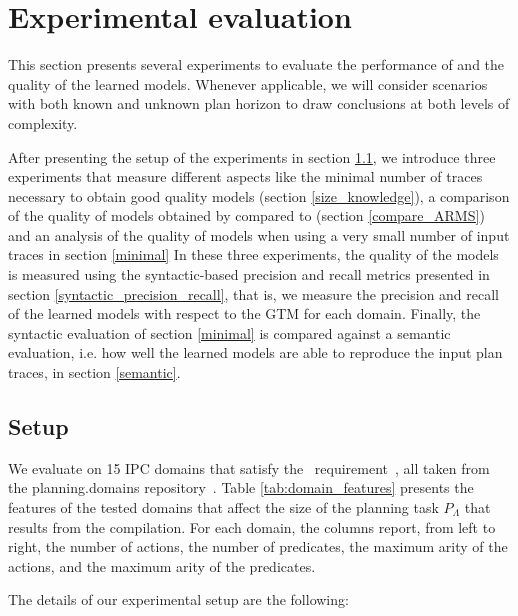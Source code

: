 
\section{Experimental evaluation}
\label{sec:experiments}

This section presents several experiments to evaluate the performance of \FAMA and the quality of the learned models. Whenever applicable, we will consider scenarios with both known and unknown plan horizon to draw conclusions at both levels of complexity.

After presenting the setup of the experiments in section \ref{setup}, we introduce three experiments that measure different aspects like the minimal number of traces necessary to obtain good quality models (section \ref{size_knowledge}), a comparison of the quality of models obtained by \FAMA compared to \ARMS (section \ref{compare_ARMS}) and an analysis of the quality of models when using a very small number of input traces in section \ref{minimal} In these three experiments, the quality of the models is measured using the syntactic-based precision and recall metrics presented in section \ref{syntactic_precision_recall}, that is, we measure the precision and recall of the learned models with respect to the GTM for each domain. Finally, the syntactic evaluation of section \ref{minimal} is compared against a semantic evaluation, i.e. how well the learned models are able to reproduce the input plan traces, in section \ref{semantic}.



\subsection{Setup}
\label{setup}

We evaluate \FAMA on 15 IPC domains that satisfy the \strips\ requirement~\cite{fox2003pddl2}, all taken from the {\sc planning.domains} repository~\cite{muise2016planning}. Table \ref{tab:domain_features} presents the features of the tested domains that affect the size of the planning task $P_\Lambda$ that results from the compilation. For each domain, the columns report, from left to right, the number of actions, the number of predicates, the maximum arity of the actions, and the maximum arity of the predicates.

The details of our experimental setup are the following:

